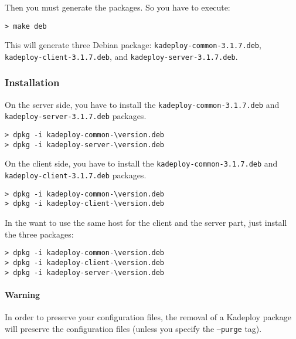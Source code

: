 \documentclass[a4wide,10pt,oneside]{book}
\newcommand{\version}{3.1.7}
\begin{document}
\noindent Then you must generate the packages. So you have to execute:
\begin{small}
\begin{verbatim}
> make deb
\end{verbatim}
\end{small}
This will generate three Debian package: \texttt{kadeploy-common-\version.deb}, \texttt{kadeploy-client-\version.deb}, and \texttt{kadeploy-server-\version.deb}.
\subsubsection{Installation}
\noindent On the server side, you have to install the \texttt{kadeploy-common-\version.deb} and \texttt{kadeploy-server-\version.deb} packages.
\begin{small}
\begin{Verbatim}[commandchars=\\\{\}]
> dpkg -i kadeploy-common-\version.deb
> dpkg -i kadeploy-server-\version.deb
\end{Verbatim}
\end{small}

\noindent On the client side, you have to install the \texttt{kadeploy-common-\version.deb} and \texttt{kadeploy-client-\version.deb} packages.
\begin{small}
\begin{Verbatim}[commandchars=\\\{\}]
> dpkg -i kadeploy-common-\version.deb
> dpkg -i kadeploy-client-\version.deb
\end{Verbatim}
\end{small}

\noindent In the want to use the same host for the client and the server part, just install the three packages:
\begin{small}
\begin{Verbatim}[commandchars=\\\{\}]
> dpkg -i kadeploy-common-\version.deb
> dpkg -i kadeploy-client-\version.deb
> dpkg -i kadeploy-server-\version.deb
\end{Verbatim}
\end{small}

\paragraph{Warning}
In order to preserve your configuration files, the removal of a Kadeploy package will preserve the configuration files (unless you specify the \texttt{--purge} tag).
\end{document}
